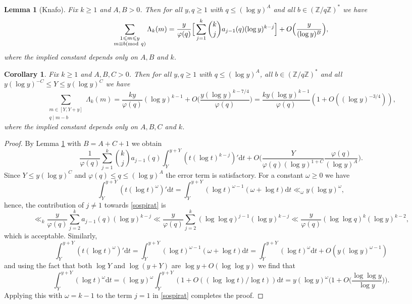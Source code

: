 \documentclass[reqno, 11pt]{amsart}
\numberwithin{equation}{section}
\newtheorem{lemma}[theorem]{Lemma}
\newtheorem{corollary}[theorem]{Corollary}
\theoremstyle{definition}
\renewcommand{\phi}{\varphi}
\newcommand{\0}{\mathbf{0}}
\renewcommand{\leq}{\leqslant}
\renewcommand{\geq}{\geqslant}
\newcommand{\md}[1]{  \left(\textnormal{mod}\ #1\right)}
\renewcommand{\leq}{\leqslant}
\renewcommand{\geq}{\geqslant}
\renewcommand{\#}{\sharp}
\begin{document}
\begin{lemma}[Knafo]\label{lemma:knafo} Fix $k\geq 1 $ and $A,B>0$. Then for all $y,q\geq 1$ with 
$q\leq (\log y)^A$ and all $b\in (\mathbb Z/q\mathbb Z)^*$  we have  $$ 
\sum_{\substack{1\leq m \leq y  \\ m\equiv b \md q  }} \Lambda_k(m)
= \frac{ y }{\phi(q)}\Big[\sum_{j=1}^k  {k \choose j } a_{j-1}(q)(\log y)^{k-j}\Big]+
O\Big(\frac{y}{(\log y)^B}    \Big) ,$$ where the implied constant depends only on $A,B$ and $k$.
\end{lemma}  \begin{corollary}\label{cowboys from hell:pantera}Fix $k\geq 1 $ and $A,B,C>0$. Then for all $y,q\geq 1$ with 
$q\leq (\log y)^A$, all $b\in (\mathbb Z/q\mathbb Z)^*$ and all  $y (\log y)^{-C}\leq Y \leq y (\log y)^C$ we have 
$$ \sum_{\substack{m \in [Y,Y+y] \\ q \mid m-b  }} \Lambda_k(m)= \frac{   ky }{\phi(q)} (\log y)^{k-1} +
O\Big( \frac{ y(\log y)^{k-7/4}}{\phi(q)}\Big) = \frac{ ky (\log y)^{k-1}  }{\phi(q)}  
(1 + O(   (\log y)^{-3/4} ) ),$$ where the implied constant depends only on $A,B,C$ and $k$.\end{corollary}
\begin{proof}By Lemma \ref{lemma:knafo} with $B=A+C+1$  we obtain  \begin{equation}\label{sospirat} \frac{1}{\phi(q)}\sum_{j=1}^k 
{k \choose j } a_{j-1}(q)  \int_Y^{y+Y}   ( t (\log t)^{k-j} )' \mathrm d t  + O\Big(\frac{Y}{\phi(q)(\log y)^{1+C}}  
\frac{\phi(q)}{(\log y )^A}  \Big). \end{equation} Since $Y\leq y (\log y)^C$ and $\phi(q) \leq q \leq (\log y )^A$
the error term is satisfactory. For a constant $\omega \geq 0 $ we have  $$\int_Y^{y+Y}  
( t (\log t)^{\omega} )' \mathrm d t  =\int_Y^{y+Y}     (\log t)^{\omega-1} (\omega + \log t) \mathrm d t \ll_\omega y (\log y)^{\omega}
,$$ hence, the contribution of $j\neq 1 $ towards \eqref{sospirat} is $$ \ll_k  \frac{y}{\phi(q)}\sum_{j=2}^k 
a_{j-1}(q)   (\log y)^{k-j} \ll  \frac{y}{\phi(q)} \sum_{j=2}^k   (\log \log q ) ^{j-1}  (\log y)^{k-j} 
\ll \frac{y}{\phi(q)}(\log \log q)^k  (\log y)^{k-2},$$ which is acceptable. Similarly,  $$\int_Y^{y+Y}  
( t (\log t)^{\omega} )' \mathrm d t  =\int_Y^{y+Y}     (\log t)^{\omega-1} (\omega + \log t) \mathrm d t 
=\int_Y^{y+Y}(\log t)^\omega  \mathrm d t+O( y (\log y)^{\omega -1 } )  $$ and using the fact that both $\log Y$ and $\log (y+Y)$ 
are $\log y  + O(\log \log y )$ we find that   $$\int_Y^{y+Y}(\log t)^\omega  \mathrm d t = (\log y )^\omega 
\int_Y^{y+Y}(1+O((\log \log t)/\log t)) \mathrm d t   = y (\log y )^\omega \Big( 1+  O\Big ( \frac{ \log \log y }{\log y } \Big)
\Big ).$$ Applying this with $\omega=k-1$ to the term $j=1$ in \eqref{sospirat} completes the proof.\end{proof}
\end{document}
